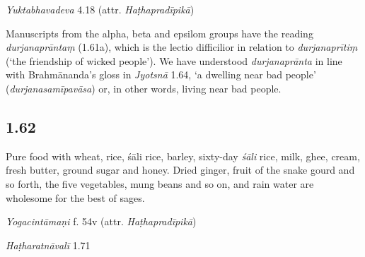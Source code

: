 \begin{ekdosis}
\begin{testimonia}[hp01_061]
\emph{Yuktabhavadeva} 4.18 (attr. \emph{Haṭhapradīpikā})
\begin{versinnote}
\end{versinnote}

\end{testimonia}

\begin{philcomm}[hp01_061]
Manuscripts from the alpha, beta and epsilom groups have the reading \emph{durjanaprāntaṃ} (1.61a), which is the lectio difficilior in relation to \emph{durjanaprītiṃ} (`the friendship of wicked people'). We have understood \emph{durjanaprānta} in line with Brahmānanda's gloss in \emph{Jyotsnā} 1.64, `a dwelling near bad people' (\emph{durjanasamīpavāsa}) or, in other words, living near bad people.  
\end{philcomm}

\subsection*{1.62}
\begin{translation}[hp01_062]
Pure food with wheat, rice, śāli rice, barley, sixty-day \emph{śāli} rice, milk, ghee, cream, fresh butter, ground sugar and honey. Dried ginger, fruit of the snake gourd and so forth, the five vegetables, mung beans and so on, and rain water are wholesome for the best of sages.
\end{translation}


\begin{testimonia}[hp01_062]
\emph{Yogacintāmaṇi} f. 54v (attr. \emph{Haṭhapradīpikā})

\begin{versinnote}
\end{versinnote}

\emph{Haṭharatnāvalī} 1.71


\end{testimonia}
\end{ekdosis}
